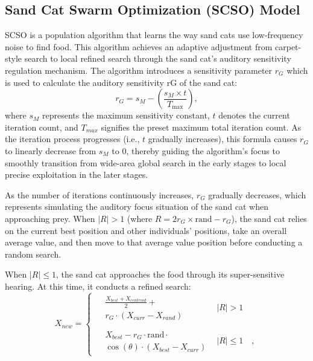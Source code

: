\documentclass[conference]{{IEEEtran}}
\begin{document}
\subsection{Sand Cat Swarm Optimization (SCSO) Model}

SCSO is a population algorithm that learns the way sand cats use low-frequency noise to find food. This algorithm achieves an adaptive adjustment from carpet-style search to local refined search through the sand cat's auditory sensitivity regulation mechanism. The algorithm introduces a sensitivity parameter $r_G$ which is used to calculate the auditory sensitivity
rG of the sand cat:\begin{equation}
    r_G = s_M - \left( \frac{s_M \times t}{T_{\max}} \right),
    \label{eq:scso_sensitivity}
\end{equation}
where $s_M$ represents the maximum sensitivity constant, $t$ denotes the current iteration count, and $T_{max}$ signifies the preset maximum total iteration count. As the iteration process progresses (i.e., $t$ gradually increases), this formula causes $r_G$ to linearly decrease from $s_M$ to 0, thereby guiding the algorithm's focus to smoothly transition from wide-area global search in the early stages to local precise exploitation in the later stages.

As the number of iterations continuously increases, $r_G$ gradually decreases, which represents simulating the auditory focus situation of the sand cat when approaching prey.  When $|R| > 1$ (where $R = 2r_G \times \text{rand} - r_G$), the sand cat relies on the current best position and other individuals' positions, take an overall average value, and then move to that average value position before conducting a random search.
    
When $|R| \le 1$, the sand cat approaches the food through its super-sensitive hearing. At this time, it conducts a refined search:
\begin{equation}
    X_{new} = 
    \begin{cases} 
    \begin{aligned}
        &\frac{X_{best} + X_{centroid}}{2} + \\
        &r_G \cdot (X_{curr} - X_{rand}) 
    \end{aligned} 
    & |R| > 1 \quad \\
    \\[5pt]   
    \begin{aligned}
        &X_{best} - r_G \cdot \text{rand} \cdot \\
        &\cos(\theta) \cdot (X_{best} - X_{curr})
    \end{aligned} 
    & |R| \le 1 \quad,
    \end{cases}
    \label{eq:scso_update}
\end{equation}
\end{document}

